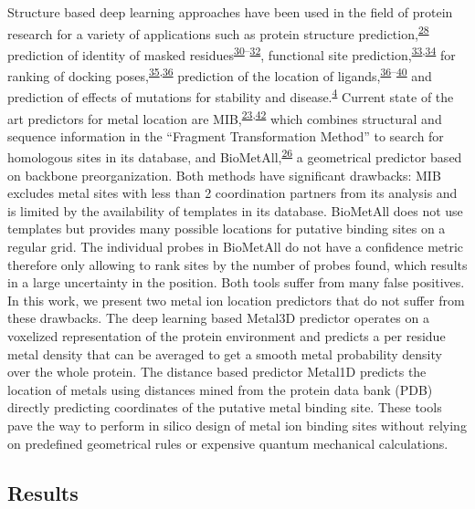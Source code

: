 \documentclass[ lineno,
  9pt]{elife}
\begin{document}
Structure based deep learning approaches have been used in the field of protein research for a variety of applications such as protein structure prediction,\textsuperscript{\protect\hyperlink{ref-yZfcMIwh}{28}} prediction of identity of masked residues\textsuperscript{\protect\hyperlink{ref-ls5kyxZ3}{30}--\protect\hyperlink{ref-6szq3cwi}{32}}, functional site prediction,\textsuperscript{\protect\hyperlink{ref-SGggOw7Z}{33},\protect\hyperlink{ref-MKP16DSu}{34}} for ranking of docking poses,\textsuperscript{\protect\hyperlink{ref-q224Kv8w}{35},\protect\hyperlink{ref-yBhqGkBa}{36}} prediction of the location of ligands,\textsuperscript{\protect\hyperlink{ref-yBhqGkBa}{36}--\protect\hyperlink{ref-9UNjBvCL}{40}} and prediction of effects of mutations for stability and disease.\textsuperscript{\protect\hyperlink{ref-4sXp2sDw}{4}}
Current state of the art predictors for metal location are MIB,\textsuperscript{\protect\hyperlink{ref-1HMhB3vxM}{23},\protect\hyperlink{ref-k859wJxx}{42}} which combines structural and sequence information in the ``Fragment Transformation Method'' to search for homologous sites in its database, and BioMetAll,\textsuperscript{\protect\hyperlink{ref-iHxzzTCG}{26}} a geometrical predictor based on backbone preorganization. Both methods have significant drawbacks: MIB excludes metal sites with less than 2 coordination partners from its analysis and is limited by the availability of templates in its database. BioMetAll does not use templates but provides many possible locations for putative binding sites on a regular grid. The individual probes in BioMetAll do not have a confidence metric therefore only allowing to rank sites by the number of probes found, which results in a large uncertainty in the position. Both tools suffer from many false positives. In this work, we present two metal ion location predictors that do not suffer from these drawbacks. The deep learning based Metal3D predictor operates on a voxelized representation of the protein environment and predicts a per residue metal density that can be averaged to get a smooth metal probability density over the whole protein. The distance based predictor Metal1D predicts the location of metals using distances mined from the protein data bank (PDB) directly predicting coordinates of the putative metal binding site. These tools pave the way to perform in silico design of metal ion binding sites without relying on predefined geometrical rules or expensive quantum mechanical calculations.

\hypertarget{results}{%
\subsection{Results}\label{results}}
\end{document}
